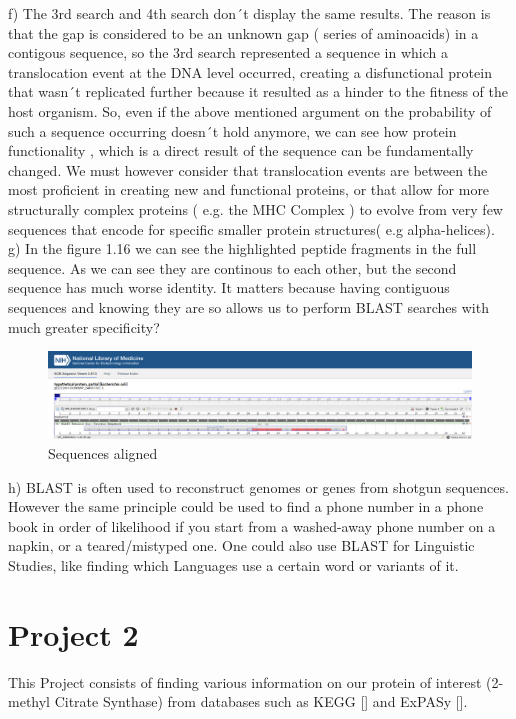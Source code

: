 \documentclass[a4paper,english,12pt,bibliography=totoc]{scrreprt}
\begin{document}
f) The 3rd search and 4th search don´t display the same results. The reason is that the gap is considered to be an unknown gap ( series of aminoacids) in a contigous sequence, so the 3rd search represented a sequence in which a translocation event at the DNA level occurred, creating a disfunctional protein that wasn´t replicated further because it resulted as a hinder to the fitness of the host organism. So, even if the above mentioned argument on the probability of such a sequence occurring doesn´t hold anymore, we can see how protein functionality , which is a direct result of the sequence can be fundamentally changed.
We must however consider that translocation events are between the most proficient in creating new and functional proteins, or that allow for more structurally complex proteins ( e.g. the MHC Complex ) to evolve from very few sequences that encode for specific smaller protein structures( e.g alpha-helices). \\

g) In the figure 1.16 we can see the highlighted peptide fragments in the full sequence. As we can see they are continous to each  other, but the second sequence has much worse identity. It matters because having contiguous sequences and knowing they are so allows us to perform BLAST searches with much greater specificity?
\begin{figure}[H]
    \centering
    \includegraphics[width=0.99\linewidth]{Project 1/alignement.png}
    \caption{Sequences aligned}
    \label{fig:enter-label}
\end{figure}

h) BLAST is often used to reconstruct genomes or genes from shotgun sequences. However the same principle could be used to find a phone number in a phone book in order of likelihood if you start from a washed-away phone number on a napkin, or a teared/mistyped one. One could also use BLAST for Linguistic Studies, like finding which Languages use a certain word or variants of it.  \\

\chapter{Project 2}
This Project consists of finding various information on our protein of interest (2-methyl Citrate Synthase) from databases such as KEGG [\cite{kanehisa_kegg_2023}] and ExPASy [\cite{gasteiger_expasy_2003}].
\end{document}
